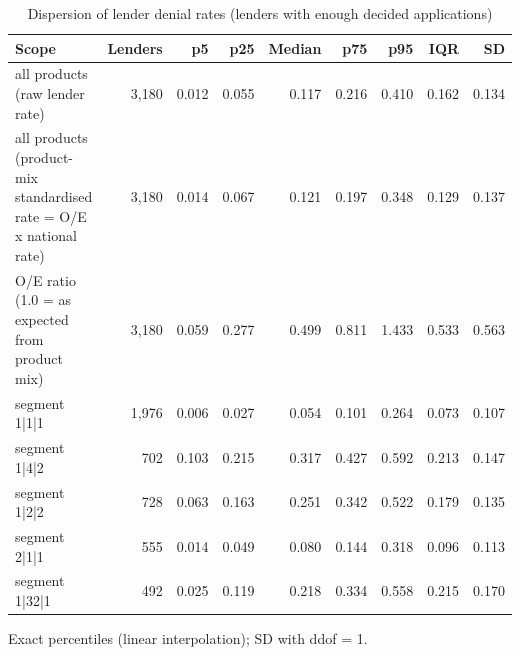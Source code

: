 \begin{table}[t]
\centering
\caption{Dispersion of lender denial rates (lenders with enough decided applications)}
\label{tab:table4_q2_lender_dispersion}
\small
\begin{tabular}{lrrrrrrrr}
\toprule
Scope & Lenders & p5 & p25 & Median & p75 & p95 & IQR & SD \\
\midrule
all products (raw lender rate) & 3,180 & 0.012 & 0.055 & 0.117 & 0.216 & 0.410 & 0.162 & 0.134 \\
all products (product-mix standardised rate = O/E x national rate) & 3,180 & 0.014 & 0.067 & 0.121 & 0.197 & 0.348 & 0.129 & 0.137 \\
O/E ratio (1.0 = as expected from product mix) & 3,180 & 0.059 & 0.277 & 0.499 & 0.811 & 1.433 & 0.533 & 0.563 \\
segment 1|1|1 & 1,976 & 0.006 & 0.027 & 0.054 & 0.101 & 0.264 & 0.073 & 0.107 \\
segment 1|4|2 & 702 & 0.103 & 0.215 & 0.317 & 0.427 & 0.592 & 0.213 & 0.147 \\
segment 1|2|2 & 728 & 0.063 & 0.163 & 0.251 & 0.342 & 0.522 & 0.179 & 0.135 \\
segment 2|1|1 & 555 & 0.014 & 0.049 & 0.080 & 0.144 & 0.318 & 0.096 & 0.113 \\
segment 1|32|1 & 492 & 0.025 & 0.119 & 0.218 & 0.334 & 0.558 & 0.215 & 0.170 \\
\bottomrule
\end{tabular}
\par\footnotesize Exact percentiles (linear interpolation); SD with ddof = 1.
\end{table}
